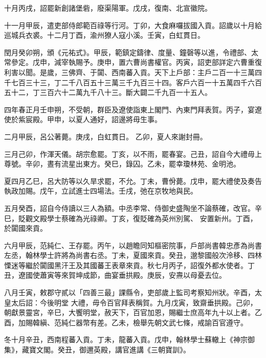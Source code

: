 \begin{pinyinscope}
 十月丙戌，詔罷新創諸堡砦，廢渠陽軍。戊戌，復南、北宣徽院。



 十一月甲辰，遣吏部侍郎範百祿等行河。丁卯，大食麻囉拔國入貢。詔歲以十月給巡城兵衣裘。十二月丁酉，渝州獠人寇小溪。壬寅，白虹貫日。



 閏月癸卯朔，頒《元祐式》。甲辰，範鎮定鑄律、度量、鐘磬等以進，令禮部、太常參定。戊申，減宰執賜予。庚申，置六曹尚書權官。丙寅，詔吏部詳定六曹重復
 利害以聞。是歲，三佛齊、于闐、西南蕃入貢。天下上戶部：主戶二百一十三萬四千七百三十三，丁二千八百五十三萬三千九百三十四。客戶六百一十五萬四千六百五十二，丁三百六十二萬九千八十三。斷大闢二千九百一十五人。



 四年春正月壬申朔，不受朝，群臣及遼使詣東上閣門、內東門拜表賀。丙子，宴遼使於紫宸殿。甲申，以夏人通好，詔邊將毋生事。



 二月甲辰，呂公著薨。庚戌，白虹貫日。
 乙卯，夏人來謝封冊。



 三月己卯，作渾天儀。胡宗愈罷。丁亥，以不雨，罷春宴。己丑，詔自今大禮毋上尊號。辛卯，晝有流星出東方。癸巳，錄囚。乙未，罷幸瓊林苑、金明池。



 夏四月乙巳，呂大防等以久旱求罷，不允。丁未，曹佾薨。戊申，罷大禮使及奏告執政加賜。戊午，立試進士四場法。壬戌，弛在京牧地與民。



 五月癸酉，詔自今侍讀以三人為額。中丞李常、侍御史盛陶坐不論蔡確，改官。辛巳，貶觀文殿學士蔡確為光祿卿。丁亥，復貶確為英州別駕、
 安置新州。丁酉，於闐國來貢。



 六月甲辰，范純仁、王存罷。丙午，以趙瞻同知樞密院事，戶部尚書韓忠彥為尚書左丞，翰林學士許將為尚書右丞。丁未，夏國來貢。癸丑，邈黎國般次泠移、四林慄迷等繼於闐國黑汗王及其國蕃王表章來貢。秋七月丙子，詔復外都水使者。丁丑，遼國使蕭寅等來賀坤成節，曲宴垂拱殿。庚辰，安燾以母憂去位。



 八月壬寅，敕郡守貳以「四善三最」課縣令，吏部歲上監司考察知州狀。辛酉，太皇太后詔：今後明堂
 大禮，毋令百官拜表稱賀。九月戊寅，致齋垂拱殿。己卯，朝獻景靈宮，辛巳，大饗明堂，赦天下，百官加恩，賜繼士庶高年九十以上者。乙酉，加賜韓縝、范純仁器幣有差。乙未，檢舉先朝文武七條，戒諭百官遵守。



 冬十月辛丑，西南程蕃入貢。丁未，龍蕃入貢。戊申，翰林學士蘇轍上《神宗御集》，藏寶文閣。癸丑，御邇英殿，講官進講《三朝寶訓》。




\end{pinyinscope}
